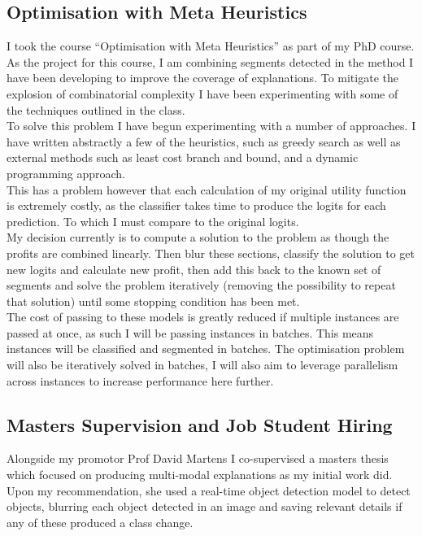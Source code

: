 \subsection{Optimisation with Meta Heuristics}

I took the course “Optimisation with Meta Heuristics” as part of my PhD course. As the project for this course, I am combining segments detected in the method I have been developing to improve the coverage of explanations. To mitigate the explosion of combinatorial complexity I have been experimenting with some of the techniques outlined in the class. \\

To solve this problem I have begun experimenting with a number of approaches. I have written abstractly a few of the heuristics, such as greedy search as well as external methods such as least cost branch and bound, and a dynamic programming approach. \\

This has a problem however that each calculation of my original utility function is extremely costly, as the classifier takes time to produce the logits for each prediction. To which I must compare to the original logits. \\

My decision currently is to compute a solution to the problem as though the profits are combined linearly. Then blur these sections, classify the solution to get new logits and calculate new profit, then add this back to the known set of segments and solve the problem iteratively (removing the possibility to repeat that solution) until some stopping condition has been met. \\

The cost of passing to these models is greatly reduced if multiple instances are passed at once, as such I will be passing instances in batches. This means instances will be classified and segmented in batches. The optimisation problem will also be iteratively solved in batches, I will also aim to leverage parallelism across instances to increase performance here further.

\subsection{Masters Supervision and Job Student Hiring}

Alongside my promotor Prof David Martens I co-supervised a masters thesis which focused on producing multi-modal explanations as my initial work did. Upon my recommendation, she used a real-time object detection model to detect objects, blurring each object detected in an image and saving relevant details if any of these produced a class change. \\

